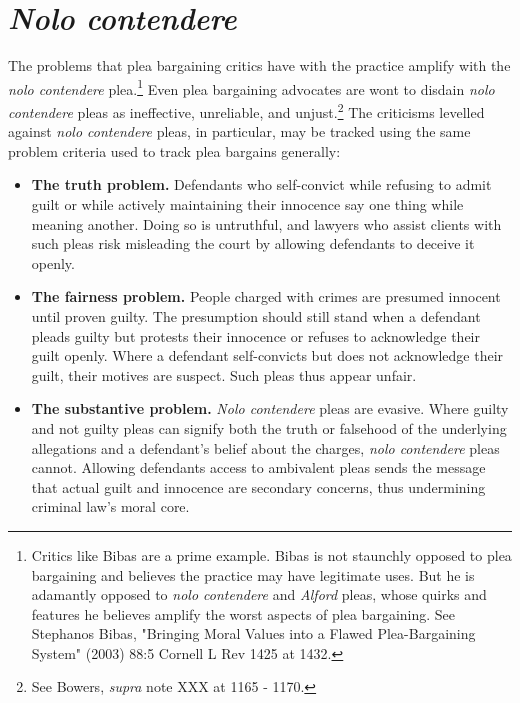 \section{\textit{Nolo contendere}}

The problems that plea bargaining critics have with the practice amplify with the \textit{nolo contendere} plea.\footnote{Critics like Bibas are a prime example. Bibas is not staunchly opposed to plea bargaining and believes the practice may have legitimate uses. But he is adamantly opposed to \textit{nolo contendere} and \textit{Alford} pleas, whose quirks and features he believes amplify the worst aspects of plea bargaining. See Stephanos Bibas, "Bringing Moral Values into a Flawed Plea-Bargaining System" (2003) 88:5 Cornell L Rev 1425 at 1432.} Even plea bargaining advocates are wont to disdain \textit{nolo contendere} pleas as ineffective, unreliable, and unjust.\footnote{See Bowers, \textit{supra} note XXX at 1165 - 1170.} The criticisms levelled against \textit{nolo contendere} pleas, in particular, may be tracked using the same problem criteria used to track plea bargains generally:

\begin{itemize}
    \item \textbf{The truth problem.} Defendants who self-convict while refusing to admit guilt or while actively maintaining their innocence say one thing while meaning another. Doing so is untruthful, and lawyers who assist clients with such pleas risk misleading the court by allowing defendants to deceive it openly. 
    \item \textbf{The fairness problem.} People charged with crimes are presumed innocent until proven guilty. The presumption should still stand when a defendant pleads guilty but protests their innocence or refuses to acknowledge their guilt openly. Where a defendant self-convicts but does not acknowledge their guilt, their motives are suspect. Such pleas thus appear unfair. 
    \item \textbf{The substantive problem.} \textit{Nolo contendere} pleas are evasive. Where guilty and not guilty pleas can signify both the truth or falsehood of the underlying allegations and a defendant's belief about the charges, \textit{nolo contendere} pleas cannot. Allowing defendants access to ambivalent pleas sends the message that actual guilt and innocence are secondary concerns, thus undermining criminal law's moral core. 
    
\end{itemize}

